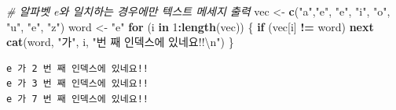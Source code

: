 \documentclass[
  11pt,
]{krantz}
\newenvironment{Shaded}{\begin{snugshade}}{\end{snugshade}}
\newcommand{\CharTok}[1]{\textcolor[rgb]{0.5,0.5,0.5}{#1}}
\newcommand{\CommentTok}[1]{\textcolor[rgb]{0.37,0.37,0.37}{\textit{#1}}}
\newcommand{\ControlFlowTok}[1]{\textcolor[rgb]{0.27,0.27,0.27}{\textbf{#1}}}
\newcommand{\DecValTok}[1]{\textcolor[rgb]{0.06,0.06,0.06}{#1}}
\newcommand{\KeywordTok}[1]{\textcolor[rgb]{0.27,0.27,0.27}{\textbf{#1}}}
\newcommand{\NormalTok}[1]{#1}
\newcommand{\OperatorTok}[1]{\textcolor[rgb]{0.43,0.43,0.43}{\textbf{#1}}}
\newcommand{\StringTok}[1]{\textcolor[rgb]{0.5,0.5,0.5}{#1}}
\begin{document}
\begin{Shaded}
\begin{Highlighting}[]
\CommentTok{# 알파벳 e와 일치하는 경우에만 텍스트 메세지 출력}
\NormalTok{vec <-}\StringTok{ }\KeywordTok{c}\NormalTok{(}\StringTok{"a"}\NormalTok{,}\StringTok{"e"}\NormalTok{, }\StringTok{"e"}\NormalTok{, }\StringTok{"i"}\NormalTok{, }\StringTok{"o"}\NormalTok{, }\StringTok{"u"}\NormalTok{, }\StringTok{"e"}\NormalTok{, }\StringTok{"z"}\NormalTok{)}
\NormalTok{word <-}\StringTok{ "e"}
\ControlFlowTok{for}\NormalTok{ (i }\ControlFlowTok{in} \DecValTok{1}\OperatorTok{:}\KeywordTok{length}\NormalTok{(vec)) \{}
  \ControlFlowTok{if}\NormalTok{ (vec[i] }\OperatorTok{!=}\StringTok{ }\NormalTok{word) }\ControlFlowTok{next}
  \KeywordTok{cat}\NormalTok{(word, }\StringTok{"가"}\NormalTok{, i, }\StringTok{"번 째 인덱스에 있네요!!}\CharTok{\textbackslash{}n}\StringTok{"}\NormalTok{)}
\NormalTok{\}}
\end{Highlighting}
\end{Shaded}

\begin{verbatim}
e 가 2 번 째 인덱스에 있네요!!
e 가 3 번 째 인덱스에 있네요!!
e 가 7 번 째 인덱스에 있네요!!
\end{verbatim}

\normalsize

  

\printindex
\end{document}

